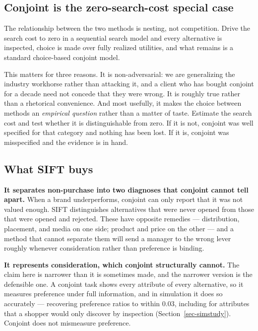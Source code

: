 \documentclass[
  letterpaper,
  DIV=11,
  numbers=noendperiod]{scrartcl}
\begin{document}
\subsection{Conjoint is the zero-search-cost special
case}\label{conjoint-is-the-zero-search-cost-special-case}

The relationship between the two methods is nesting, not competition.
Drive the search cost to zero in a sequential search model and every
alternative is inspected, choice is made over fully realized utilities,
and what remains is a standard choice-based conjoint model.

This matters for three reasons. It is non-adversarial: we are
generalizing the industry workhorse rather than attacking it, and a
client who has bought conjoint for a decade need not concede that they
were wrong. It is roughly true rather than a rhetorical convenience. And
most usefully, it makes the choice between methods an \emph{empirical
question} rather than a matter of taste. Estimate the search cost and
test whether it is distinguishable from zero. If it is not, conjoint was
well specified for that category and nothing has been lost. If it is,
conjoint was misspecified and the evidence is in hand.

\subsection{What SIFT buys}\label{what-sift-buys}

\textbf{It separates non-purchase into two diagnoses that conjoint
cannot tell apart.} When a brand underperforms, conjoint can only report
that it was not valued enough. SIFT distinguishes alternatives that were
never opened from those that were opened and rejected. These have
opposite remedies --- distribution, placement, and media on one side;
product and price on the other --- and a method that cannot separate
them will send a manager to the wrong lever roughly whenever
consideration rather than preference is binding.

\textbf{It represents consideration, which conjoint structurally
cannot.} The claim here is narrower than it is sometimes made, and the
narrower version is the defensible one. A conjoint task shows every
attribute of every alternative, so it measures preference under full
information, and in simulation it does so accurately --- recovering
preference ratios to within 0.03, including for attributes that a
shopper would only discover by inspection (Section~\ref{sec-simstudy}).
Conjoint does not mismeasure preference.
\end{document}
